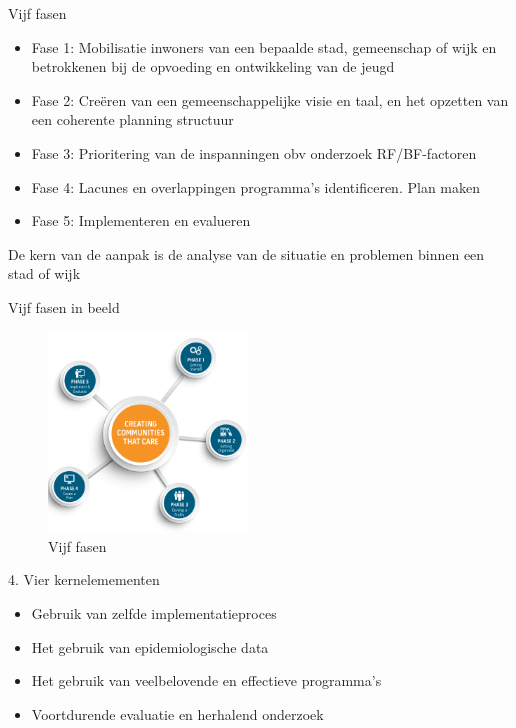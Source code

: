 \documentclass[
  ignorenonframetext,
]{beamer}
\providecommand{\tightlist}{%
  \setlength{\itemsep}{0pt}\setlength{\parskip}{0pt}}\usepackage{longtable,booktabs,array}
\begin{document}
\begin{frame}{Vijf fasen}
\protect\hypertarget{vijf-fasen}{}
\begin{itemize}
\tightlist
\item
  Fase 1: Mobilisatie inwoners van een bepaalde stad, gemeenschap of
  wijk en betrokkenen bij de opvoeding en ontwikkeling van de jeugd\\
\item
  Fase 2: Creëren van een gemeenschappelijke visie en taal, en het
  opzetten van een coherente planning structuur\\
\item
  Fase 3: Prioritering van de inspanningen obv onderzoek
  RF/BF-factoren\\
\item
  Fase 4: Lacunes en overlappingen programma's identificeren. Plan
  maken\\
\item
  Fase 5: Implementeren en evalueren
\end{itemize}

De kern van de aanpak is de analyse van de situatie en problemen binnen
een stad of wijk
\end{frame}

\begin{frame}{Vijf fasen in beeld}
\protect\hypertarget{vijf-fasen-in-beeld}{}
\begin{figure}

{\centering \includegraphics[width=2.08333in,height=\textheight]{images/Fasen.png}

}

\caption{Vijf fasen}

\end{figure}
\end{frame}

\begin{frame}{4. Vier kernelemementen}
\protect\hypertarget{vier-kernelemementen}{}
\begin{itemize}
\tightlist
\item
  Gebruik van zelfde implementatieproces\\
\item
  Het gebruik van epidemiologische data\\
\item
  Het gebruik van veelbelovende en effectieve programma's\\
\item
  Voortdurende evaluatie en herhalend onderzoek
\end{itemize}
\end{frame}
\end{document}
